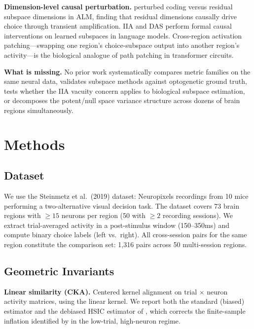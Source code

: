 \documentclass{article}
\begin{document}
\textbf{Dimension-level causal perturbation.} \citet{pereira2025residual} perturbed coding versus residual subspace dimensions in ALM, finding that residual dimensions causally drive choice through transient amplification. IIA \citep{geiger2024finding} and DAS \citep{geiger2024causal} perform formal causal interventions on learned subspaces in language models. Cross-region activation patching---swapping one region's choice-subspace output into another region's activity---is the biological analogue of path patching in transformer circuits.

\textbf{What is missing.} No prior work systematically compares metric families on the same neural data, validates subspace methods against optogenetic ground truth, tests whether the IIA vacuity concern applies to biological subspace estimation, or decomposes the potent/null space variance structure across dozens of brain regions simultaneously.

\section{Methods}

\subsection{Dataset}

We use the Steinmetz et al.\ (2019) dataset: Neuropixels recordings from 10 mice performing a two-alternative visual decision task. The dataset covers 73 brain regions with $\geq 15$ neurons per region (50 with $\geq 2$ recording sessions). We extract trial-averaged activity in a post-stimulus window (150--350ms) and compute binary choice labels (left vs.\ right). All cross-session pairs for the same region constitute the comparison set: 1,316 pairs across 50 multi-session regions.

\subsection{Geometric Invariants}

\textbf{Linear similarity (CKA).} Centered kernel alignment \citep{kornblith2019similarity} on trial $\times$ neuron activity matrices, using the linear kernel. We report both the standard (biased) estimator and the debiased HSIC estimator of \citet{song2012feature}, which corrects the finite-sample inflation identified by \citet{murphy2024biased} in the low-trial, high-neuron regime.
\end{document}
